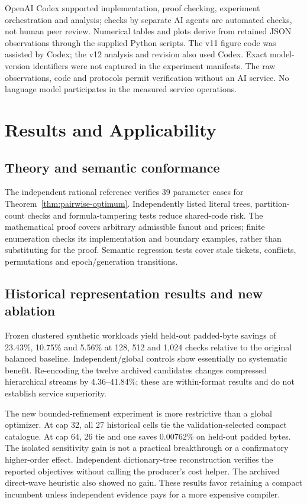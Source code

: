 \documentclass[10pt,journal,compsoc]{IEEEtran}
\theoremstyle{definition}\newtheorem{definition}[theorem]{Definition}
\begin{document}
OpenAI Codex supported implementation, proof checking, experiment orchestration
and analysis; checks by separate AI agents are automated checks, not human
peer review. Numerical tables and plots derive from retained JSON observations
through the supplied Python scripts. The v11 figure code was assisted by
Codex; the v12 analysis and revision also used Codex. Exact model-version
identifiers were not captured in the experiment manifests.
The raw observations, code and protocols permit verification without an AI
service. No language model participates in the measured service operations.

\section{Results and Applicability}\label{sec:jresults}
\subsection{Theory and semantic conformance}
The independent rational reference verifies 39 parameter cases for
Theorem~\ref{thm:pairwise-optimum}. Independently listed literal trees,
partition-count checks and formula-tampering tests reduce shared-code risk.
The mathematical proof covers arbitrary admissible fanout and prices;
finite enumeration checks its implementation and boundary examples, rather
than substituting for the proof. Semantic regression tests cover stale
tickets, conflicts, permutations and epoch/generation transitions.

\subsection{Historical representation results and new ablation}
Frozen clustered synthetic workloads yield held-out padded-byte savings of
23.43\%, 10.75\% and 5.56\% at 128, 512 and 1,024 checks relative to the
original balanced baseline. Independent/global controls show essentially
no systematic benefit. Re-encoding the twelve archived candidates changes
compressed hierarchical streams by 4.36--41.84\%; these are within-format
results and do not establish service superiority.

The new bounded-refinement experiment is more restrictive than a global
optimizer. At cap 32, all 27 historical cells tie the validation-selected
compact catalogue. At cap 64, 26 tie and one saves 0.00762\% on held-out
padded bytes. The isolated sensitivity gain is not a practical breakthrough
or a confirmatory higher-order effect. Independent dictionary-tree
reconstruction verifies the reported objectives without calling the
producer's cost helper. The archived direct-wave heuristic also showed
no gain. These results favor retaining a compact incumbent unless
independent evidence pays for a more expensive compiler.
\end{document}
